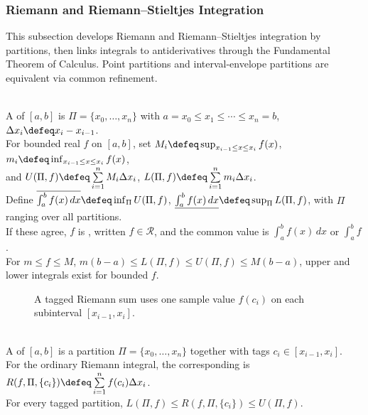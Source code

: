 \subsubsection{Riemann and Riemann--Stieltjes Integration}

This subsection develops Riemann and Riemann--Stieltjes integration by partitions, then links integrals to antiderivatives through the Fundamental Theorem of Calculus. Point partitions and interval-envelope partitions are equivalent via common refinement.

\begin{definition} \label{def:partition-and-riemann-upper-lower-sums}\label{def:riemann-stieltjes-core-source-todo} \\
A  of $[a,b]$ is $\Pi=\{x_0,\ldots,x_n\}$ with $a=x_0\leq x_1\leq\cdots\leq x_n=b$, $\Delta x_i\defeq x_i-x_{i-1}$.\\
For bounded real $f$ on $[a,b]$, set $M_i\defeq\sup_{x_{i-1}\leq x\leq x_i}f(x)$, $m_i\defeq\inf_{x_{i-1}\leq x\leq x_i}f(x)$,\\
and $U(\Pi,f)\defeq\sum\limits_{i=1}^{n}M_i\Delta x_i$, $L(\Pi,f)\defeq\sum\limits_{i=1}^{n}m_i\Delta x_i$.\\
Define $\overline{\int_a^b f(x)\,dx}\defeq\inf_\Pi U(\Pi,f)$, $\underline{\int_a^b f(x)\,dx}\defeq\sup_\Pi L(\Pi,f)$, with $\Pi$ ranging over all partitions.\\
If these agree, $f$ is , written $f\in\mathcal{R}$, and the common value is $\int_a^b f(x)\,dx$ or $\int_a^b f$.\\
For $m\leq f\leq M$, $m(b-a)\leq L(\Pi,f)\leq U(\Pi,f)\leq M(b-a)$, upper and lower integrals exist for bounded $f$.
\end{definition}

\begin{figure}[H]
  \centering
  
  \caption{A tagged Riemann sum uses one sample value $f(c_i)$ on each subinterval $[x_{i-1},x_i]$.}
  \label{fig:riemann-tagged-sum}
\end{figure}

\begin{definition} \label{def:tagged-partitions-and-riemann-sums} \\
A  of $[a,b]$ is a partition $\Pi=\{x_0,\ldots,x_n\}$ together with tags $c_i\in[x_{i-1},x_i]$.\\
For the ordinary Riemann integral, the corresponding  is $R(f,\Pi,\{c_i\})\defeq\sum\limits_{i=1}^{n}f(c_i)\Delta x_i$.\\
For every tagged partition, $L(\Pi,f)\leq R(f,\Pi,\{c_i\})\leq U(\Pi,f)$.
\end{definition}

